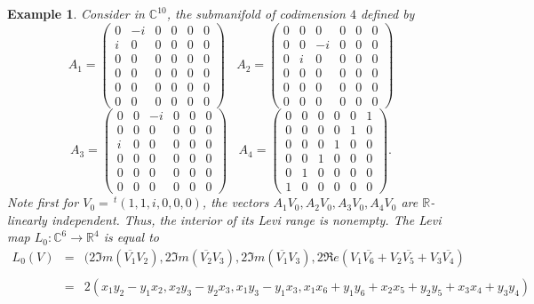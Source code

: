 \documentclass[10pt,a4paper]{amsart}
\newcommand{\C}{\mathbb C}
\newcommand{\R}{\mathbb R}
\newcommand{\transp}{\,^t}
\newtheorem{example}[theo]{Example}
\numberwithin{equation}{section}
\begin{document}
\begin{example}
Consider in $\C^{10}$, the submanifold of codimension $4$ defined by  
$$A_1=
\begin{pmatrix}
	0& -i & 0 & 0 & 0 & 0 \\ i &0 & 0 & 0 & 0 & 0 \\ 0 &0 & 0 & 0 & 0 & 0 \\ 0 &0 & 0 & 0 & 0 & 0 \\ 0 &0 & 0 & 0 & 0 & 0 \\ 0 &0 & 0 & 0 & 0 & 0
\end{pmatrix} \ \ \ \ 
A_2=
\begin{pmatrix}
	0& 0 & 0 & 0 & 0 & 0 \\ 0 &0 & -i & 0 & 0 & 0 \\ 0 &i & 0 & 0 & 0 & 0 \\ 0 &0 & 0 & 0 & 0 & 0 \\ 0 &0 & 0 & 0 & 0 & 0 \\ 0 &0 & 0 & 0 & 0 & 0
\end{pmatrix}$$
$$A_3=
\begin{pmatrix}
	0& 0 & -i & 0 & 0 & 0 \\ 0 &0 & 0 & 0 & 0 & 0 \\ i &0 & 0 & 0 & 0 & 0 \\ 0 &0 & 0 & 0 & 0 & 0 \\ 0 &0 & 0 & 0 & 0 & 0 \\ 0 &0 & 0 & 0 & 0 & 0
\end{pmatrix} \ \ \ \ 
 A_4=
\begin{pmatrix}
	0& 0 & 0 & 0 & 0 & 1 \\ 0 &0 & 0 & 0 & 1 & 0 \\ 0 &0 & 0 & 1 & 0 & 0 \\ 0 &0 & 1 & 0 & 0 & 0 \\ 0 &1 & 0 & 0 & 0 & 0 \\ 1 &0 & 0 & 0 & 0 & 0
\end{pmatrix}.$$
Note first for $V_0=\transp(1,1,i,0,0,0)$, the vectors $A_1V_0,A_2V_0,A_3V_0,A_4V_0$ are $\R$-linearly independent. Thus, the interior of its Levi range is nonempty. The Levi map $L_0: \C^6 \to \R^4$ is equal to
\begin{eqnarray*}
L_0(V)& =& (2\Im m (\overline{V_1}V_2),2\Im m (\overline{V_2}V_3),2\Im m (\overline{V_1}V_3),2\Re e (V_1\overline{V_6}+V_2\overline{V_5}+V_3\overline{V_4})\\
\\
& =& 2(x_1y_2-y_1x_2,x_2y_3-y_2x_3,x_1y_3-y_1x_3,x_1x_6+y_1y_6+x_2x_5+y_2y_5+x_3x_4+y_3y_4)\\

\end{eqnarray*}
\end{example}
\end{document}
